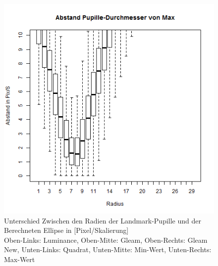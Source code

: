 \begin{figure}
	\includegraphics[width=0.32\linewidth]{Eye_Img_Box/Max_Radius_P}
	\caption{Unterschied Zwischen den Radien der Landmark-Pupille und der Berechneten Ellipse in [Pixel/Skalierung]\\Oben-Links: Luminance, Oben-Mitte: Gleam, Oben-Rechts: Gleam New, Unten-Links: Quadrat, Unten-Mitte: Min-Wert, Unten-Rechts: Max-Wert}
	\label{ElSe_Gray_Pupille}
\end{figure}
